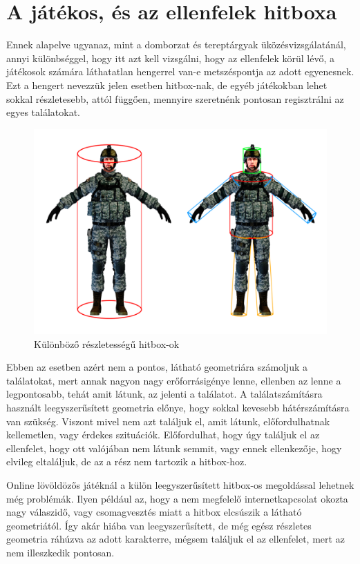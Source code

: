 \section{A játékos, és az ellenfelek hitboxa}

Ennek alapelve ugyanaz, mint a domborzat és tereptárgyak üközésvizsgálatánál, annyi különbséggel, hogy itt azt kell vizsgálni, hogy az ellenfelek körül lévő, a játékosok számára láthatatlan hengerrel van-e metszéspontja az adott egyenesnek. Ezt a hengert nevezzük jelen esetben hitbox-nak, de egyéb játékokban lehet sokkal részletesebb, attól függően, mennyire szeretnénk pontosan regisztrálni az egyes találatokat.

\begin{figure}[h]
\centering
\includegraphics[scale=0.38]{kepek/hitbox.png}
\caption{Különböző részletességű hitbox-ok}
\label{fig:hitbox}
\end{figure}

Ebben az esetben azért nem a pontos, látható geometriára számoljuk a találatokat, mert annak nagyon nagy erőforrásigénye lenne, ellenben az lenne a legpontosabb, tehát amit látunk, az jelenti a találatot. A találatszámításra használt leegyszerűsített geometria előnye, hogy sokkal kevesebb hátérszámításra van szükség. Viszont mivel nem azt találjuk el, amit látunk, előfordulhatnak kellemetlen, vagy érdekes szituációk. Előfordulhat, hogy úgy találjuk el az ellenfelet, hogy ott valójában nem látunk semmit, vagy ennek ellenkezője, hogy elvileg eltaláljuk, de az a rész nem tartozik a hitbox-hoz.

Online lövöldözős játéknál a külön leegyszerűsített hitbox-os megoldással lehetnek még problémák. Ilyen például az, hogy a nem megfelelő internetkapcsolat okozta nagy válaszidő, vagy csomagvesztés miatt a hitbox elcsúszik a látható geometriától. Így akár hiába van leegyszerűsített, de még egész részletes geometria ráhúzva az adott karakterre, mégsem találjuk el az ellenfelet, mert az nem illeszkedik pontosan.

